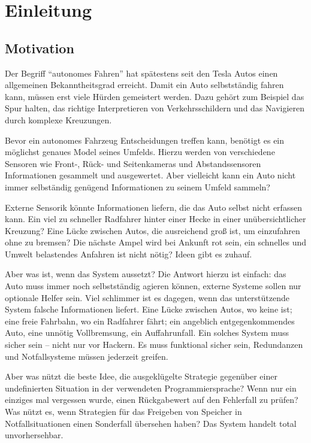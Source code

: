 
\chapter{Einleitung}

\section{Motivation}
Der Begriff \enquote{autonomes Fahren} hat spätestens seit den Tesla Autos einen allgemeinen Bekanntheitsgrad erreicht. Damit ein Auto selbstständig fahren kann, müssen erst viele Hürden gemeistert werden.
Dazu gehört zum Beispiel das Spur halten, das richtige Interpretieren von Verkehrsschildern und das Navigieren durch komplexe Kreuzungen.

Bevor ein autonomes Fahrzeug Entscheidungen treffen kann, benötigt es ein möglichst genaues Model seines Umfelds.
Hierzu werden von verschiedene Sensoren wie Front-, Rück- und Seitenkameras und Abstandssensoren Informationen gesammelt und ausgewertet.
Aber vielleicht kann ein Auto nicht immer selbständig genügend Informationen zu seinem Umfeld sammeln? %

Externe Sensorik könnte Informationen liefern, die das Auto selbst nicht erfassen kann.
Ein viel zu schneller Radfahrer hinter einer Hecke in einer unübersichtlicher Kreuzung?
Eine Lücke zwischen Autos, die ausreichend groß ist, um einzufahren ohne zu bremsen?
Die nächste Ampel wird bei Ankunft rot sein, ein schnelles und Umwelt belastendes Anfahren ist nicht nötig?
Ideen gibt es zuhauf.

Aber was ist, wenn das System aussetzt?
Die Antwort hierzu ist einfach: das Auto muss immer noch selbstständig agieren können, externe Systeme sollen nur optionale Helfer sein.
Viel schlimmer ist es dagegen, wenn das unterstützende System falsche Informationen liefert.
Eine Lücke zwischen Autos, wo keine ist; eine freie Fahrbahn, wo ein Radfahrer fährt; ein angeblich entgegenkommendes Auto, eine unnötig Vollbremsung, ein Auffahrunfall.
Ein solches System muss sicher sein -- nicht nur vor Hackern.
Es muss funktional sicher sein, Redundanzen und Notfallsysteme müssen jederzeit greifen.

Aber was nützt die beste Idee, die ausgeklügelte Strategie gegenüber einer undefinierten Situation in der verwendeten Programmiersprache?
Wenn nur ein einziges mal vergessen wurde, einen Rückgabewert auf den Fehlerfall zu prüfen?
Was nützt es, wenn Strategien für das Freigeben von Speicher in Notfallsituationen einen Sonderfall übersehen haben?
Das System handelt total unvorhersehbar.

